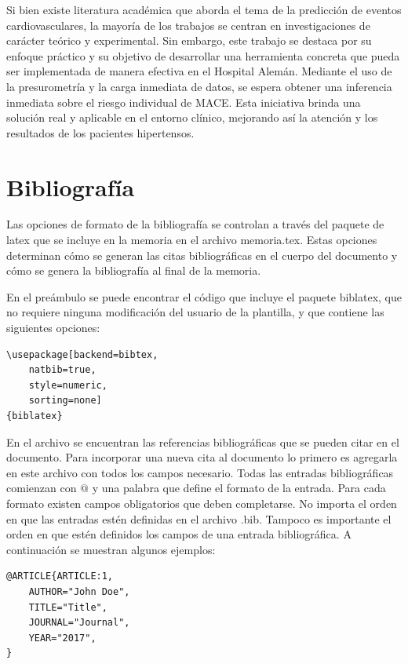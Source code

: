 Si bien existe literatura académica que aborda el tema de la predicción de eventos cardiovasculares, 
la mayoría de los trabajos se centran en investigaciones de carácter teórico y experimental. Sin embargo, este trabajo 
se destaca por su enfoque práctico y su objetivo de desarrollar una herramienta concreta que pueda ser implementada 
de manera efectiva en el Hospital Alemán. Mediante el uso de la presurometría  y la carga inmediata de datos, se espera 
obtener una inferencia inmediata sobre el riesgo individual de MACE. Esta iniciativa brinda una solución real y 
aplicable en el entorno clínico, mejorando así la atención y los resultados de los pacientes hipertensos.


\section{Bibliografía}
\label{sec:biblio}

Las opciones de formato de la bibliografía se controlan a través del paquete de latex  que se incluye en la memoria en el archivo memoria.tex.  Estas opciones determinan cómo se generan las citas bibliográficas en el cuerpo del documento y cómo se genera la bibliografía al final de la memoria.

En el preámbulo se puede encontrar el código que incluye el paquete biblatex, que no requiere ninguna modificación del usuario de la plantilla, y que contiene las siguientes opciones:

\begin{lstlisting}
\usepackage[backend=bibtex,
	natbib=true, 
	style=numeric, 
	sorting=none]
{biblatex}
\end{lstlisting}

En el archivo  se encuentran las referencias bibliográficas que se pueden citar en el documento.  Para incorporar una nueva cita al documento lo primero es agregarla en este archivo con todos los campos necesario.  Todas las entradas bibliográficas comienzan con $@$ y una palabra que define el formato de la entrada.  Para cada formato existen campos obligatorios que deben completarse. No importa el orden en que las entradas estén definidas en el archivo .bib.  Tampoco es importante el orden en que estén definidos los campos de una entrada bibliográfica. A continuación se muestran algunos ejemplos:

\begin{lstlisting}
@ARTICLE{ARTICLE:1,
    AUTHOR="John Doe",
    TITLE="Title",
    JOURNAL="Journal",
    YEAR="2017",
}
\end{lstlisting}



